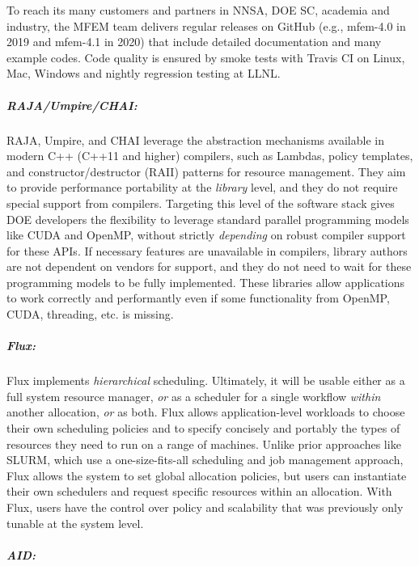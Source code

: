 To reach its many customers and partners in NNSA, DOE SC,
academia and industry, the MFEM team delivers regular releases on GitHub
(e.g., mfem-4.0 in 2019 and mfem-4.1 in 2020) that include
detailed documentation and many example codes.  Code quality is ensured
by smoke tests with Travis CI on Linux, Mac, Windows and nightly
regression testing at LLNL.

\subparagraph{RAJA/Umpire/CHAI:}
RAJA, Umpire, and CHAI leverage the abstraction mechanisms available in
modern C++ (C++11 and higher) compilers, such as Lambdas, policy
templates, and constructor/destructor (RAII) patterns for resource
management.  They aim to provide performance portability at the {\it
library} level, and they do not require special support from compilers.
Targeting this level of the software stack gives DOE developers the
flexibility to leverage standard parallel programming models like CUDA
and OpenMP, without strictly {\it depending} on robust compiler support
for these APIs.  If necessary features are unavailable in compilers,
library authors are not dependent on vendors for support, and they do not
need to wait for these programming models to be fully implemented.  These
libraries allow applications to work correctly and performantly even if
some functionality from OpenMP, CUDA, threading, etc. is missing.

\subparagraph{Flux:}
Flux implements {\it hierarchical} scheduling.  Ultimately, it will be
usable either as a full system resource manager, {\it or} as a scheduler
for a single workflow {\it within} another allocation, {\it or} as both.
Flux allows application-level workloads to choose their own scheduling
policies and to specify concisely and portably the types of resources
they need to run on a range of machines.  Unlike prior approaches like
SLURM, which use a one-size-fits-all scheduling and job management
approach, Flux allows the system to set global allocation policies, but
users can instantiate their own schedulers and request specific resources
within an allocation.  With Flux, users have the control over policy and
scalability that was previously only tunable at the system level.

\subparagraph{AID:}

